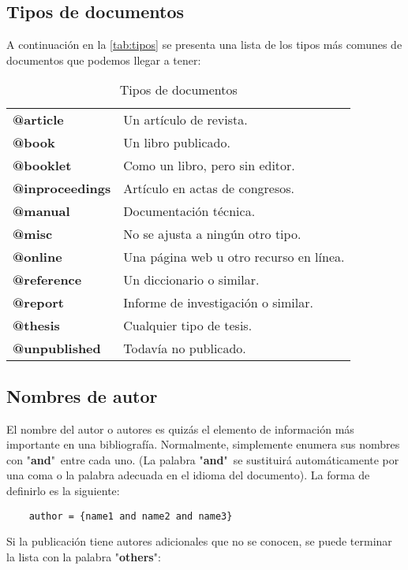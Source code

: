 \subsection{Tipos de documentos}

A continuación en la \autoref{tab:tipos} se presenta una lista de los tipos más comunes de documentos que podemos llegar a tener:
\begin{table}[htbp]
	\centering
	\caption{Tipos de documentos}
	\begin{tabular}{ll}
		\toprule
		\textbf{@article} 		& Un artículo de revista. \\
		\textbf{@book} 			& Un libro publicado. \\
		\textbf{@booklet} 		& Como un libro, pero sin editor. \\
		\textbf{@inproceedings} & Artículo en actas de congresos. \\
		\textbf{@manual} 		& Documentación técnica. \\
		\textbf{@misc} 			& No se ajusta a ningún otro tipo. \\
		\textbf{@online} 		& Una página web u otro recurso en línea. \\
		\textbf{@reference} 	& Un diccionario o similar. \\
		\textbf{@report} 		& Informe de investigación o similar. \\
		\textbf{@thesis} 		& Cualquier tipo de tesis. \\
		\textbf{@unpublished} 	& Todavía no publicado. \\
		\bottomrule
	\end{tabular}%
	\label{tab:tipos}%
\end{table}%

\subsection{Nombres de autor}

El nombre del autor o autores es quizás el elemento de información más importante en una bibliografía. Normalmente, simplemente enumera sus nombres con "\textbf{and}"\ entre cada uno. (La palabra "\textbf{and}"\ se sustituirá automáticamente por una coma o la palabra adecuada en el idioma del documento). La forma de definirlo es la siguiente:

\begin{lstlisting}
	author = {name1 and name2 and name3}
\end{lstlisting}

Si la publicación tiene autores adicionales que no se conocen, se puede terminar la lista con la palabra "\textbf{others}":

